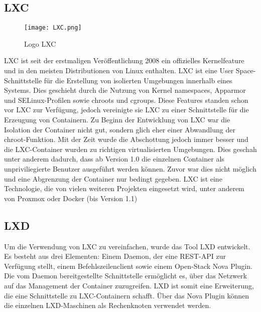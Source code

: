 \subsection*{\ac{LXC}}
\label{sec:LXC}
\begin{wrapfigure}{r}{0.4\textwidth}
	\vspace{-40pt}
	\begin{center}
		\texttt{[image: LXC.png]}
	\end{center}
	\vspace{-15pt}
	\caption[Logo \ac{LXC}]{Logo \ac{LXC} \footnotemark}
	\label{fig:LXC}
	\vspace{-30pt}
\end{wrapfigure}
\ac{LXC} ist seit der erstmaligen Veröffentlichung 2008 ein offizielles Kernelfeature und in den meisten Distributionen von Linux enthalten. \ac{LXC} ist eine User Space-Schnittstelle für die Erstellung von isolierten Umgebungen innerhalb eines Systems. Dies geschieht durch die Nutzung von Kernel namespaces, Apparmor und SELinux-Profilen sowie chroots und cgroups. Diese Features standen schon vor \ac{LXC} zur Verfügung, jedoch vereinigte sie \ac{LXC} zu einer Schnittstelle für die Erzeugung von Containern. Zu Beginn der Entwicklung von \ac{LXC} war die Isolation der Container nicht gut, sondern glich eher einer Abwandlung der chroot-Funktion. Mit der Zeit wurde die Abschottung jedoch immer besser und die \ac{LXC}-Container wurden zu richtigen virtualisierten Umgebungen. Dies geschah unter anderem dadurch, dass ab Version 1.0 die einzelnen Container als unpriviliegierte Benutzer ausgeführt werden können. Zuvor war dies nicht möglich und eine Abgrenzung der Container nur bedingt gegeben. \ac{LXC} ist eine Technologie, die von vielen weiteren Projekten eingesetzt wird, unter anderem von Proxmox oder Docker (bis Version 1.1)\cite{IEEE7036275, IEEE7185212, IEEE7571957,IEEE7929714,LXCHomepage}


\subsection*{LXD}
\label{sec:lxd}

Um die Verwendung von \ac{LXC} zu vereinfachen, wurde das Tool LXD entwickelt. Es besteht aus drei Elementen: Einem Daemon, der eine REST-API zur Verfügung stellt, einem Befehlszeilenclient sowie einem Open-Stack Nova Plugin. Die vom Daemon bereitgestellte Schnittstelle ermöglicht es, über das Netzwerk auf das Management der Container zuzugreifen. LXD ist somit eine Erweiterung, die eine Schnittstelle zu \ac{LXC}-Containern schafft. Über das Nova Plugin können die einzelnen LXD-Maschinen als Rechenknoten verwendet werden. \cite{LXDHomepage}

